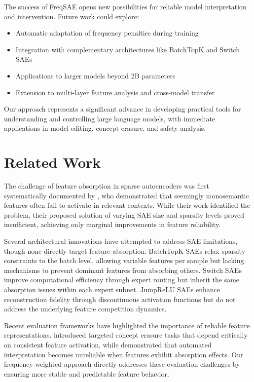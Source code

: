 \documentclass{article} %
\begin{document}
The success of FreqSAE opens new possibilities for reliable model interpretation and intervention. Future work could explore:
\begin{itemize}
    \item Automatic adaptation of frequency penalties during training
    \item Integration with complementary architectures like BatchTopK and Switch SAEs
    \item Applications to larger models beyond 2B parameters
    \item Extension to multi-layer feature analysis and cross-model transfer
\end{itemize}

Our approach represents a significant advance in developing practical tools for understanding and controlling large language models, with immediate applications in model editing, concept erasure, and safety analysis.

\section{Related Work}
\label{sec:related}

The challenge of feature absorption in sparse autoencoders was first systematically documented by \citet{chaninAbsorptionStudyingFeature2024}, who demonstrated that seemingly monosemantic features often fail to activate in relevant contexts. While their work identified the problem, their proposed solution of varying SAE size and sparsity levels proved insufficient, achieving only marginal improvements in feature reliability.

Several architectural innovations have attempted to address SAE limitations, though none directly target feature absorption. BatchTopK SAEs \citep{bussmannBatchTopKSparseAutoencoders2024} relax sparsity constraints to the batch level, allowing variable features per sample but lacking mechanisms to prevent dominant features from absorbing others. Switch SAEs \citep{mudideEfficientDictionaryLearning2024a} improve computational efficiency through expert routing but inherit the same absorption issues within each expert subnet. JumpReLU SAEs \citep{rajamanoharanJumpingAheadImproving2024} enhance reconstruction fidelity through discontinuous activation functions but do not address the underlying feature competition dynamics.

Recent evaluation frameworks have highlighted the importance of reliable feature representations. \citet{karvonenEvaluatingSparseAutoencoders2024} introduced targeted concept erasure tasks that depend critically on consistent feature activation, while \citet{pauloAutomaticallyInterpretingMillions2024} demonstrated that automated interpretation becomes unreliable when features exhibit absorption effects. Our frequency-weighted approach directly addresses these evaluation challenges by ensuring more stable and predictable feature behavior.
\end{document}
